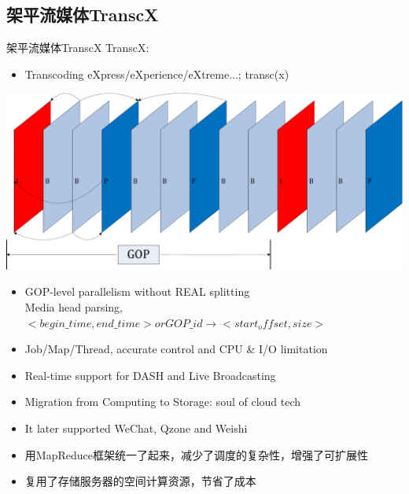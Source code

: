 \documentclass{beamer}
\begin{document}
\subsection{架平流媒体TranscX}
\begin{frame}{架平流媒体TranscX}
TranscX: 
\begin{itemize}
	\item Transcoding eXpress/eXperience/eXtreme...; transc(x)
\end{itemize}
\begin{center}
\includegraphics[scale=0.20]{fig/GOP.pdf}
\end{center}
\begin{itemize}
\item GOP-level parallelism without REAL splitting\\
Media head parsing, $<begin\_time, end\_time> or GOP\_id \rightarrow <start_offset, size>$
\end{itemize}
\end{frame}
\begin{frame}
\begin{itemize}
\item Job/Map/Thread, accurate control and CPU \& I/O limitation
\item Real-time support for DASH and Live Broadcasting
\item Migration from Computing to Storage: soul of cloud tech
\item It later supported WeChat, Qzone and Weishi
\item 用MapReduce框架统一了起来，减少了调度的复杂性，增强了可扩展性
\item 复用了存储服务器的空间计算资源，节省了成本
\end{itemize}
\end{frame}
\end{document}
